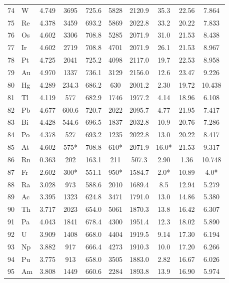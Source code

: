 \documentclass[12pt,a4paper]{article}
\theoremstyle{remark}
\begin{document}
\begin{longtable}{@{}llcccccccc@{}}
		74 & W   & 4.749 & 3695   & 725.6  & 5828   & 2120.9 & 35.3  & 22.56 & 7.864 \\
		75 & Re  & 4.378 & 3459   & 693.2  & 5869   & 2022.8 & 33.2  & 20.22 & 7.833 \\
		76 & Os  & 4.602 & 3306   & 708.8  & 5285   & 2071.9 & 31.0  & 21.53 & 8.438 \\
		77 & Ir  & 4.602 & 2719   & 708.8  & 4701   & 2071.9 & 26.1  & 21.53 & 8.967 \\
		78 & Pt  & 4.725 & 2041   & 725.2  & 4098   & 2117.0 & 19.7  & 22.53 & 8.958 \\
		79 & Au  & 4.970 & 1337   & 736.1  & 3129   & 2156.0 & 12.6  & 23.47 & 9.226 \\
		80 & Hg  & 4.289 & 234.3  & 686.2  & 630    & 2001.2 & 2.30  & 19.72 & 10.438 \\
		81 & Tl  & 4.119 & 577    & 682.9  & 1746   & 1977.2 & 4.14  & 18.96 & 6.108 \\
		82 & Pb  & 4.677 & 600.6  & 720.7  & 2022   & 2095.7 & 4.77  & 21.95 & 7.417 \\
		83 & Bi  & 4.428 & 544.6  & 696.5  & 1837   & 2032.8 & 10.9  & 20.76 & 7.286 \\
		84 & Po  & 4.378 & 527    & 693.2  & 1235   & 2022.8 & 13.0  & 20.22 & 8.417 \\
		85 & At  & 4.602 & 575*   & 708.8  & 610*   & 2071.9 & 16.0* & 21.53 & 9.317 \\
		86 & Rn  & 0.363 & 202    & 163.1  & 211    & 507.3  & 2.90  & 1.36  & 10.748 \\
		87 & Fr  & 2.602 & 300*   & 551.1  & 950*   & 1584.7 & 2.0*  & 10.89 & 4.0* \\
		88 & Ra  & 3.028 & 973    & 588.6  & 2010   & 1689.4 & 8.5   & 12.94 & 5.279 \\
		89 & Ac  & 3.395 & 1323   & 624.8  & 3471   & 1791.0 & 13.0  & 14.86 & 5.380 \\
		90 & Th  & 3.717 & 2023   & 654.0  & 5061   & 1870.3 & 13.8  & 16.42 & 6.307 \\
		91 & Pa  & 4.043 & 1841   & 678.4  & 4300   & 1951.4 & 12.3  & 18.02 & 5.890 \\
		92 & U   & 3.909 & 1408   & 668.0  & 4404   & 1919.5 & 9.14  & 17.30 & 6.194 \\
		93 & Np  & 3.882 & 917    & 666.4  & 4273   & 1910.3 & 10.0  & 17.20 & 6.266 \\
		94 & Pu  & 3.775 & 913    & 658.0  & 3505   & 1883.0 & 2.82  & 16.67 & 6.026 \\
		95 & Am  & 3.808 & 1449   & 660.6  & 2284   & 1893.8 & 13.9  & 16.90 & 5.974 \\

\end{longtable}
\end{document}
